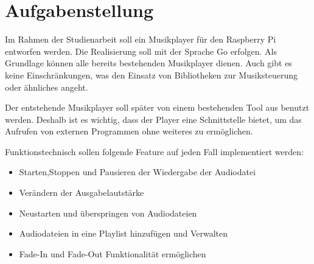 
\chapter{Aufgabenstellung}

Im Rahmen der Studienarbeit soll ein Musikplayer für den Raspberry Pi entworfen
werden. Die Realisierung soll mit der Sprache Go erfolgen. Als Grundlage können
alle bereits bestehenden Musikplayer dienen. Auch gibt es keine
Einschränkungen, was den Einsatz von Bibliotheken zur Musiksteuerung oder
ähnliches angeht. \hfill \break

Der entstehende Musikplayer soll später von einem bestehenden Tool aus benutzt
werden. Deshalb ist es wichtig, dass der Player eine Schnittstelle bietet, um
das Aufrufen von externen Programmen ohne weiteres zu ermöglichen. \hfill
\break

Funktionstechnisch sollen folgende Feature auf jeden Fall implementiert werden:
\begin{itemize}
\item Starten,Stoppen und Pausieren der Wiedergabe der Audiodatei
\item Verändern der Ausgabelautstärke
\item Neustarten und überspringen von Audiodateien
\item Audiodateien in eine Playlist hinzufügen und Verwalten
\item Fade-In und Fade-Out Funktionalität ermöglichen
\end{itemize}

